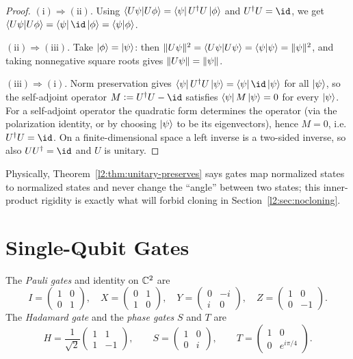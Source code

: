 \begin{proof}
$(\mathrm{i})\Rightarrow(\mathrm{ii})$. Using
$\braket{U\psi|U\phi}=\bra{\psi}U^{\dagger}U\ket{\phi}$ and $U^{\dagger}U=\id$,
we get $\braket{U\psi|U\phi}=\bra{\psi}\id\ket{\phi}=\braket{\psi|\phi}$.

$(\mathrm{ii})\Rightarrow(\mathrm{iii})$. Take $\ket{\phi}=\ket{\psi}$: then
$\lVert U\psi\rVert^{2}=\braket{U\psi|U\psi}=\braket{\psi|\psi}=\lVert\psi\rVert^{2}$, and
taking nonnegative square roots gives $\lVert U\psi\rVert=\lVert\psi\rVert$.

$(\mathrm{iii})\Rightarrow(\mathrm{i})$. Norm preservation gives
$\bra{\psi}U^{\dagger}U\ket{\psi}=\bra{\psi}\id\ket{\psi}$ for all $\ket{\psi}$,
so the self-adjoint operator $M\defeq U^{\dagger}U-\id$ satisfies
$\bra{\psi}M\ket{\psi}=0$ for every $\ket{\psi}$. For a self-adjoint operator the
quadratic form determines the operator (via the polarization identity, or by
choosing $\ket{\psi}$ to be its eigenvectors), hence $M=0$, i.e.
$U^{\dagger}U=\id$. On a finite-dimensional space a left inverse is a two-sided
inverse, so also $UU^{\dagger}=\id$ and $U$ is unitary.
\end{proof}

Physically, Theorem~\ref{l2:thm:unitary-preserves} says gates map normalized states
to normalized states and never change the ``angle'' between two states; this
inner-product rigidity is exactly what will forbid cloning in
Section~\ref{l2:sec:nocloning}.

\section{Single-Qubit Gates}

\begin{definition}
The \emph{Pauli gates} and identity on $\mathbb{C}^{2}$ are
\[
  I=\begin{pmatrix}1&0\\0&1\end{pmatrix},\quad
  X=\begin{pmatrix}0&1\\1&0\end{pmatrix},\quad
  Y=\begin{pmatrix}0&-i\\i&0\end{pmatrix},\quad
  Z=\begin{pmatrix}1&0\\0&-1\end{pmatrix}.
\]
The \emph{Hadamard gate} and the \emph{phase gates} $S$ and $T$ are
\[
  H=\frac{1}{\sqrt{2}}\begin{pmatrix}1&1\\1&-1\end{pmatrix},\qquad
  S=\begin{pmatrix}1&0\\0&i\end{pmatrix},\qquad
  T=\begin{pmatrix}1&0\\0&e^{i\pi/4}\end{pmatrix}.
\]
\end{definition}

